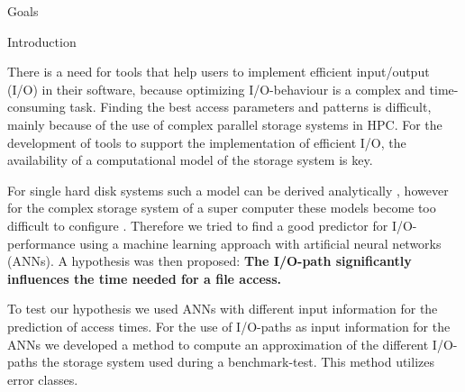 \documentclass[final]{beamer}
\newlength{\onecolwid}
\begin{document}
\begin{frame}[t]
\begin{columns}[t]
\begin{column}{\onecolwid}
\begin{alertblock}{Goals}
\end{alertblock}


\begin{block}{Introduction}
	
There is a need for tools that help users to implement efficient input/output (I/O) in their software, because optimizing I/O-behaviour is a complex and time-consuming task.
Finding the best access parameters and patterns is difficult, mainly because of the use of complex parallel storage systems in HPC.
For the development of tools to support the implementation of efficient I/O, the availability of a computational model of the storage system is key.\medskip

For single hard disk systems such a model can be derived analytically \cite{Ruemmler94anintroduction}, however for the complex storage system of a super computer these models become too difficult to configure \cite{DBLP:conf/npc/ZhangLZJC10}.
Therefore we tried to find a good predictor for I/O-performance using a machine learning approach with artificial neural networks (ANNs).
A hypothesis was then proposed: \textbf{The I/O-path significantly influences the time needed for a file access.}\medskip

To test our hypothesis we used ANNs with different input information for the prediction of access times.
For the use of I/O-paths as input information for the ANNs we developed a method to compute an approximation of the different I/O-paths the storage system used during a benchmark-test.
This method utilizes error classes.

\end{block}





\end{column}
\end{columns}
\end{frame}
\end{document}
